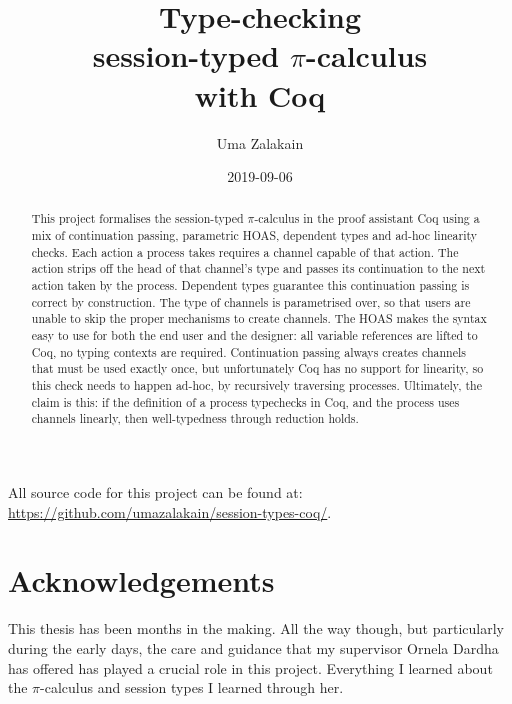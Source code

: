 \documentclass{mproj}
\newcommand{\picalc}{$\pi$-calculus}
\begin{document}
\title{Type-checking\\ session-typed \picalc \\ with Coq}
\author{Uma Zalakain}
\date{2019-09-06}
\maketitle

\begin{abstract}
    This project formalises the session-typed \picalc{} in the proof assistant Coq using a mix of continuation passing, parametric HOAS, dependent types and ad-hoc linearity checks. Each action a process takes requires a channel capable of that action. The action strips off the head of that channel's type and passes its continuation to the next action taken by the process. Dependent types guarantee this continuation passing is correct by construction. The type of channels is parametrised over, so that users are unable to skip the proper mechanisms to create channels. The HOAS makes the syntax easy to use for both the end user and the designer: all variable references are lifted to Coq, no typing contexts are required. Continuation passing always creates channels that must be used exactly once, but unfortunately Coq has no support for linearity, so this check needs to happen ad-hoc, by recursively traversing processes. Ultimately, the claim is this: if the definition of a process typechecks in Coq, and the process uses channels linearly, then well-typedness through reduction holds.
\end{abstract}

\educationalconsent
\vfill{}
All source code for this project can be found at: \url{https://github.com/umazalakain/session-types-coq/}.
\doclicenseThis
\newpage

\section*{Acknowledgements}

This thesis has been months in the making. All the way though, but particularly during the early days, the care and guidance that my supervisor Ornela Dardha has offered has played a crucial role in this project. Everything I learned about the \picalc{} and session types I learned through her.
\end{document}
